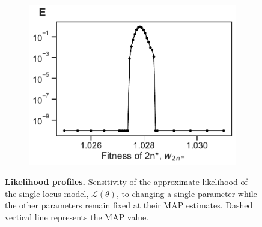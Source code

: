 \documentclass[12pt]{extarticle}
\newcommand{\likelihood}{\mathcal{L}}
\begin{document}
\begin{figure}[p]
\begin{subfigure}{0.3\textwidth}
      \includegraphics[width=\textwidth]{../figures/sensitivity-E.pdf}      
      \label{fig:sensitivity-eumt}
  \end{subfigure}
  \caption{
    \textbf{Likelihood profiles.} Sensitivity of the approximate likelihood of the single-locus model, $\likelihood(\theta)$, to changing a single parameter while the other parameters remain fixed at their MAP estimates. Dashed vertical line represents the MAP value.
  }
  
  \label{fig:sensitivity}
\end{figure}
\end{document}
